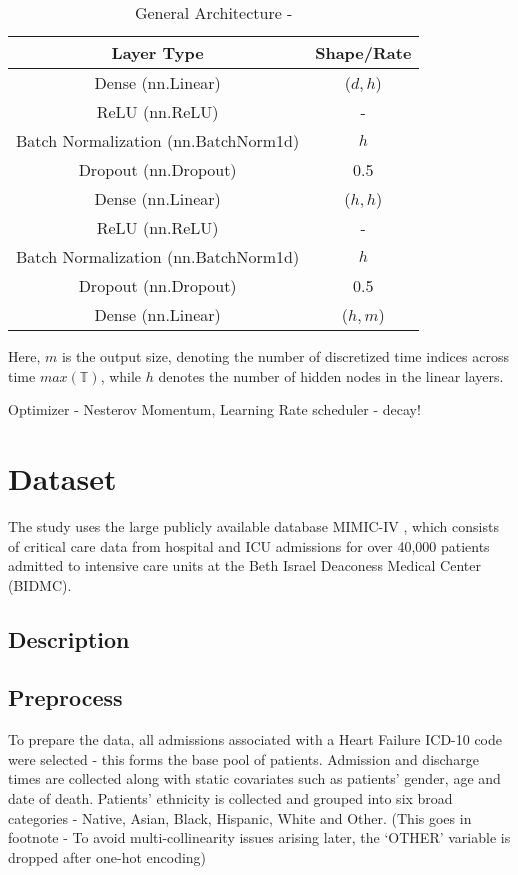 \documentclass[%
 reprint,
 amsmath,amssymb,
 aps,
]{revtex4-2}
\begin{document}
\begin{table}[h]
  \centering
  \begin{tabular}{|c|c|}
    \hline
    \textbf{Layer Type} & \textbf{Shape/Rate} \\
    \hline
    Dense (nn.Linear) & ($d, h$) \\
    ReLU (nn.ReLU) & - \\
    Batch Normalization (nn.BatchNorm1d) & $h$ \\
    Dropout (nn.Dropout) & 0.5 \\ 
    Dense (nn.Linear) & ($h, h$) \\
    ReLU (nn.ReLU) & - \\
    Batch Normalization (nn.BatchNorm1d) & $h$ \\
    Dropout (nn.Dropout) & 0.5 \\
    Dense (nn.Linear) & ($h, m$) \\
    \hline
  \end{tabular}
  \caption{General Architecture - }
  \label{tab:arch}
\end{table}

Here, $m$ is the output size, denoting the number of discretized time indices across time $max(\mathbb{T})$, while $h$ denotes the number of hidden nodes in the linear layers.

Optimizer - Nesterov Momentum, Learning Rate scheduler - decay!

\section{\label{data}Dataset}
The study uses the large publicly available database MIMIC-IV \cite{mimic_iv}, which consists of critical care data from hospital and ICU admissions for over 40,000 patients admitted to intensive care units at the Beth Israel Deaconess Medical Center (BIDMC). 
\subsection{\label{desc}Description}

\subsection{\label{preprocess}Preprocess}
To prepare the data, all admissions associated with a Heart Failure ICD-10 code were selected - this forms the base pool of patients. Admission and discharge times are collected along with static covariates such as patients' gender, age and date of death. Patients' ethnicity is collected and grouped into six broad categories - Native, Asian, Black, Hispanic, White and Other. (This goes in footnote - To avoid multi-collinearity issues arising later, the `OTHER' variable is dropped after one-hot encoding)\\
\end{document}

